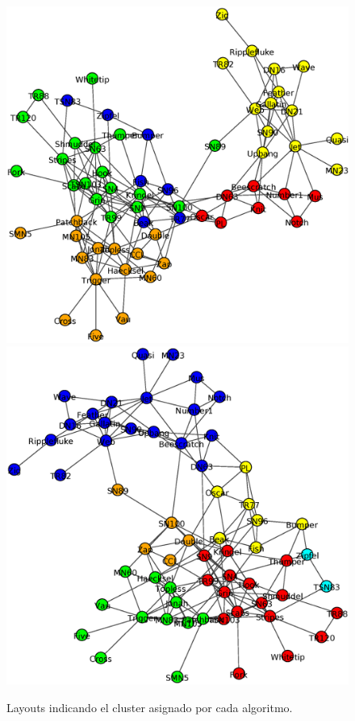 \begin{figure}
\includegraphics[scale = 0.2]{figuras/Louvain}
\includegraphics[scale = 0.2]{figuras/Infomap}
\caption{Layouts indicando el cluster asignado por cada algoritmo.}
\label{fig:Layouts_clusters}
\end{figure}

